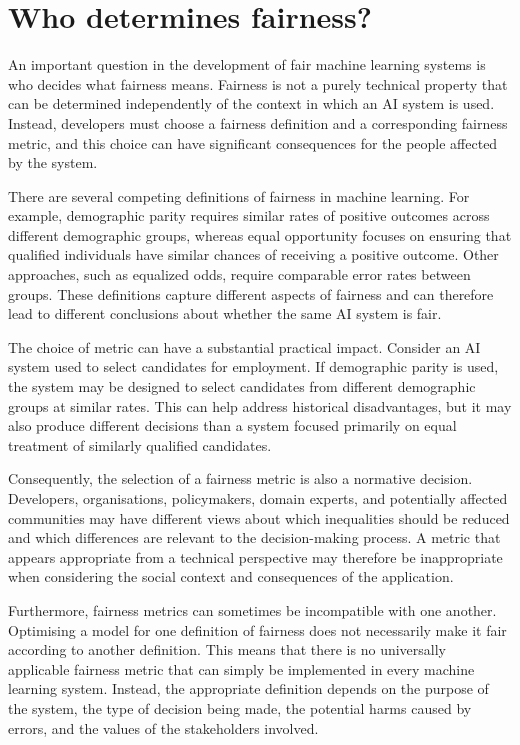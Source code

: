 \section{Who determines fairness?}
An important question in the development of fair machine learning systems is who decides what fairness means. Fairness is not a purely technical property that can be determined independently of the context in which an AI system is used. Instead, developers must choose a fairness definition and a corresponding fairness metric, and this choice can have significant consequences for the people affected by the system.

There are several competing definitions of fairness in machine learning. For example, demographic parity requires similar rates of positive outcomes across different demographic groups, whereas equal opportunity focuses on ensuring that qualified individuals have similar chances of receiving a positive outcome. Other approaches, such as equalized odds, require comparable error rates between groups. These definitions capture different aspects of fairness and can therefore lead to different conclusions about whether the same AI system is fair.

The choice of metric can have a substantial practical impact. Consider an AI system used to select candidates for employment. If demographic parity is used, the system may be designed to select candidates from different demographic groups at similar rates. This can help address historical disadvantages, but it may also produce different decisions than a system focused primarily on equal treatment of similarly qualified candidates.

Consequently, the selection of a fairness metric is also a normative decision. Developers, organisations, policymakers, domain experts, and potentially affected communities may have different views about which inequalities should be reduced and which differences are relevant to the decision-making process. A metric that appears appropriate from a technical perspective may therefore be inappropriate when considering the social context and consequences of the application.

Furthermore, fairness metrics can sometimes be incompatible with one another. Optimising a model for one definition of fairness does not necessarily make it fair according to another definition. This means that there is no universally applicable fairness metric that can simply be implemented in every machine learning system. Instead, the appropriate definition depends on the purpose of the system, the type of decision being made, the potential harms caused by errors, and the values of the stakeholders involved.


